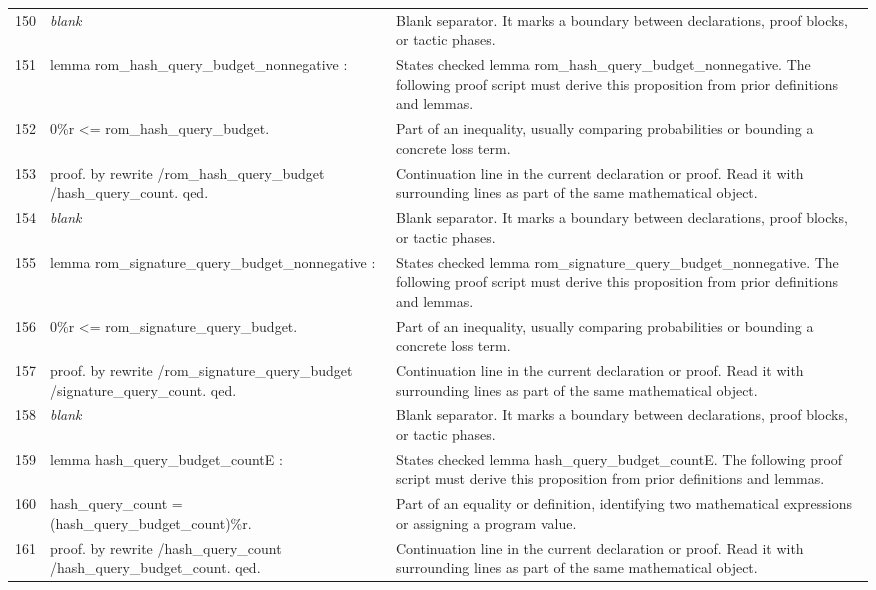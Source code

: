 \documentclass[10pt]{article}
\begin{document}
\begin{longtable}{r L{0.53\textwidth} L{0.37\textwidth}}
150 & {\ttfamily\scriptsize \emph{blank}} & Blank separator.  It marks a boundary between declarations, proof blocks, or tactic phases. \\
151 & {\ttfamily\scriptsize lemma rom\_hash\_query\_budget\_nonnegative :} & States checked lemma rom\_hash\_query\_budget\_nonnegative.  The following proof script must derive this proposition from prior definitions and lemmas. \\
152 & {\ttfamily\scriptsize   0\%r <= rom\_hash\_query\_budget.} & Part of an inequality, usually comparing probabilities or bounding a concrete loss term. \\
153 & {\ttfamily\scriptsize proof. by rewrite /rom\_hash\_query\_budget /hash\_query\_count. qed.} & Continuation line in the current declaration or proof.  Read it with surrounding lines as part of the same mathematical object. \\
154 & {\ttfamily\scriptsize \emph{blank}} & Blank separator.  It marks a boundary between declarations, proof blocks, or tactic phases. \\
155 & {\ttfamily\scriptsize lemma rom\_signature\_query\_budget\_nonnegative :} & States checked lemma rom\_signature\_query\_budget\_nonnegative.  The following proof script must derive this proposition from prior definitions and lemmas. \\
156 & {\ttfamily\scriptsize   0\%r <= rom\_signature\_query\_budget.} & Part of an inequality, usually comparing probabilities or bounding a concrete loss term. \\
157 & {\ttfamily\scriptsize proof. by rewrite /rom\_signature\_query\_budget /signature\_query\_count. qed.} & Continuation line in the current declaration or proof.  Read it with surrounding lines as part of the same mathematical object. \\
158 & {\ttfamily\scriptsize \emph{blank}} & Blank separator.  It marks a boundary between declarations, proof blocks, or tactic phases. \\
159 & {\ttfamily\scriptsize lemma hash\_query\_budget\_countE :} & States checked lemma hash\_query\_budget\_countE.  The following proof script must derive this proposition from prior definitions and lemmas. \\
160 & {\ttfamily\scriptsize   hash\_query\_count = (hash\_query\_budget\_count)\%r.} & Part of an equality or definition, identifying two mathematical expressions or assigning a program value. \\
161 & {\ttfamily\scriptsize proof. by rewrite /hash\_query\_count /hash\_query\_budget\_count. qed.} & Continuation line in the current declaration or proof.  Read it with surrounding lines as part of the same mathematical object. \\

\end{longtable}
\end{document}
